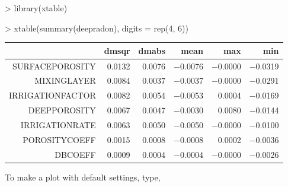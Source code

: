 \documentclass{scrartcl}
\begin{document}
\begin{Schunk}
\begin{Sinput}
> library(xtable)
\end{Sinput}
\end{Schunk}
\begin{Schunk}
\begin{Sinput}
> xtable(summary(deepradon), digits = rep(4, 6))
\end{Sinput}
\begin{table}[ht]
\begin{center}
\begin{tabular}{rrrrrr}
  \hline
 & dmsqr & dmabs & mean & max & min \\
  \hline
SURFACEPOROSITY & 0.0132 & 0.0076 & $-$0.0076 & $-$0.0000 & $-$0.0319 \\
  MIXINGLAYER & 0.0084 & 0.0037 & $-$0.0037 & $-$0.0000 & $-$0.0291 \\
  IRRIGATIONFACTOR & 0.0082 & 0.0054 & $-$0.0053 & 0.0004 & $-$0.0169 \\
  DEEPPOROSITY & 0.0067 & 0.0047 & $-$0.0030 & 0.0080 & $-$0.0144 \\
  IRRIGATIONRATE & 0.0063 & 0.0050 & $-$0.0050 & $-$0.0000 & $-$0.0100 \\
  POROSITYCOEFF & 0.0015 & 0.0008 & $-$0.0008 & 0.0002 & $-$0.0036 \\
  DBCOEFF & 0.0009 & 0.0004 & $-$0.0004 & $-$0.0000 & $-$0.0026 \\
   \hline
\end{tabular}
\end{center}
\end{table}\end{Schunk}
To make a plot with default settings, type,
\end{document}
